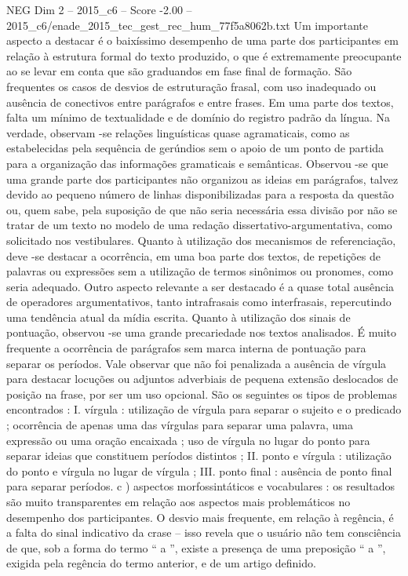\begin{textsample}{NEG Dim 2 – 2015\_c6 – Score -2.00 – 2015\_c6/enade\_2015\_tec\_gest\_rec\_hum\_77f5a8062b.txt}
Um importante aspecto a destacar é o baixíssimo desempenho de uma parte dos participantes em relação à estrutura formal do texto produzido, o que é extremamente preocupante ao se levar em conta que são graduandos em fase final de formação.
São frequentes os casos de desvios de estruturação frasal, com uso inadequado ou ausência de conectivos entre parágrafos e entre frases.
Em uma parte dos textos, falta um mínimo de textualidade e de domínio do registro padrão da língua.
Na verdade, observam -se relações linguísticas quase agramaticais, como as estabelecidas pela sequência de gerúndios sem o apoio de um ponto de partida para a organização das informações gramaticais e semânticas.
Observou -se que uma grande parte dos participantes não organizou as ideias em parágrafos, talvez devido ao pequeno número de linhas disponibilizadas para a resposta da questão ou, quem sabe, pela suposição de que não seria necessária essa divisão por não se tratar de um texto no modelo de uma redação dissertativo-argumentativa, como solicitado nos vestibulares.
Quanto à utilização dos mecanismos de referenciação, deve -se destacar a ocorrência, em uma boa parte dos textos, de repetições de palavras ou expressões sem a utilização de termos sinônimos ou pronomes, como seria adequado.
Outro aspecto relevante a ser destacado é a quase total ausência de operadores argumentativos, tanto intrafrasais como interfrasais, repercutindo uma tendência atual da mídia escrita.
Quanto à utilização dos sinais de pontuação, observou -se uma grande precariedade nos textos analisados.
É muito frequente a ocorrência de parágrafos sem marca interna de pontuação para separar os períodos.
Vale observar que não foi penalizada a ausência de vírgula para destacar locuções ou adjuntos adverbiais de pequena extensão deslocados de posição na frase, por ser um uso opcional.
São os seguintes os tipos de problemas encontrados : I. vírgula : utilização de vírgula para separar o sujeito e o predicado ; ocorrência de apenas uma das vírgulas para separar uma palavra, uma expressão ou uma oração encaixada ; uso de vírgula no lugar do ponto para separar ideias que constituem períodos distintos ; II. ponto e vírgula : utilização do ponto e vírgula no lugar de vírgula ; III. ponto final : ausência de ponto final para separar períodos. c ) aspectos morfossintáticos e vocabulares : os resultados são muito transparentes em relação aos aspectos mais problemáticos no desempenho dos participantes.
O desvio mais frequente, em relação à regência, é a falta do sinal indicativo da crase – isso revela que o usuário não tem consciência de que, sob a forma do termo “ a ”, existe a presença de uma preposição “ a ”, exigida pela regência do termo anterior, e de um artigo definido.

\end{textsample}
